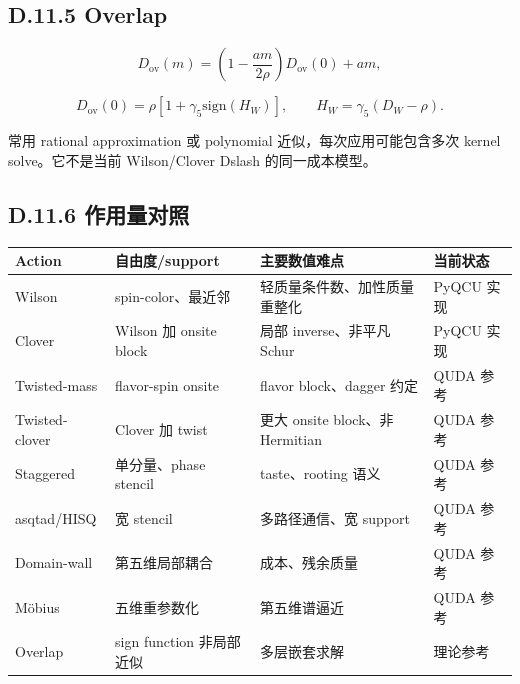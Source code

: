 \documentclass[UTF8,a4paper,10pt]{ctexart}
\DeclareRobustCommand{\pycode}[1]{\texorpdfstring{\texttt{\seqsplit{#1}}}{#1}}
\begin{document}
\subsection{D.11.5 Overlap}
\begin{displaymath}
D_{\mathrm{ov}}(m) = \left(1-\frac{am}{2\rho}\right)D_{\mathrm{ov}}(0)+am,
\end{displaymath}

\begin{displaymath}
D_{\mathrm{ov}}(0) =\rho\left[1+\gamma_5\mathrm{sign}(H_W)\right], \qquad H_W=\gamma_5(D_W-\rho).
\end{displaymath}

\pycode{sign(H\_W)} 常用 rational approximation 或 polynomial 近似，每次应用可能包含多次 kernel solve。它不是当前 Wilson/Clover Dslash 的同一成本模型。

\subsection{D.11.6 作用量对照}
\begin{center}\small
\setlength{\tabcolsep}{2pt}
\begin{longtable}{@{}>{\raggedright\arraybackslash}p{}>{\raggedright\arraybackslash}p{}>{\raggedright\arraybackslash}p{}>{\raggedright\arraybackslash}p{}@{}}
\toprule
\textbf{Action} & \textbf{自由度/support} & \textbf{主要数值难点} & \textbf{当前状态} \\
\midrule\endhead
Wilson & spin-color、最近邻 & 轻质量条件数、加性质量重整化 & PyQCU 实现 \\
Clover & Wilson 加 onsite block & 局部 inverse、非平凡 Schur & PyQCU 实现 \\
Twisted-mass & flavor-spin onsite & flavor block、dagger 约定 & QUDA 参考 \\
Twisted-clover & Clover 加 twist & 更大 onsite block、非 Hermitian & QUDA 参考 \\
Staggered & 单分量、phase stencil & taste、rooting 语义 & QUDA 参考 \\
asqtad/HISQ & 宽 stencil & 多路径通信、宽 support & QUDA 参考 \\
Domain-wall & 第五维局部耦合 & \pycode{L\_s} 成本、残余质量 & QUDA 参考 \\
Möbius & 五维重参数化 & 第五维谱逼近 & QUDA 参考 \\
Overlap & sign function 非局部近似 & 多层嵌套求解 & 理论参考 \\
\bottomrule\end{longtable}
\end{center}
\end{document}

